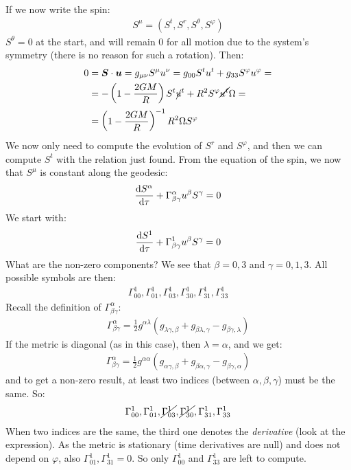 \documentclass[../template.tex]{subfiles}
\begin{document}
\begin{example}
    If we now write the spin:
    \begin{align*}
        S^\mu = (S^t, S^r, S^\theta, S^\varphi)
    \end{align*}
    $S^\theta = 0$ at the start, and will remain $0$ for all motion due to the system's symmetry (there is no reason for such a rotation). Then:
    \begin{align*}
        0 &= \bm{S} \cdot \bm{u} = g_{\mu \nu} S^\mu u^\nu = g_{00} S^t u^t + g_{33} S^\varphi u^\varphi  =\\
        &= -\left(1-\frac{2GM}{R} \right) S^t \cancel{u}^t + R^2 S^\varphi \cancel{u^t }\Omega = \\
        &= \left(1-\frac{2GM}{R} \right)^{-1} R^2 \Omega S^\varphi
    \end{align*}  
    We now only need to compute the evolution of $S^r$ and $S^\varphi$, and then we can compute $S^t$ with the relation just found. From the equation of the spin, we now that $S^\mu$ is constant along the geodesic:
    \begin{align*}
        \dv{S^\alpha}{\tau} + \Gamma^\alpha_{\beta \gamma} u^\beta S^\gamma = 0
    \end{align*} 
    We start with:
    \begin{align*}
        \dv{S^1}{\tau} + \Gamma^1_{\beta \gamma} u^\beta S^\gamma = 0
    \end{align*}
    What are the non-zero components? We see that $\beta = 0,3$ and $\gamma = 0,1,3$. All possible symbols are then:
    \begin{align*}
        \Gamma^1_{00}, \Gamma^1_{01}, \Gamma^1_{03}, \Gamma^1_{30}, \Gamma^1_{31}, \Gamma_{33}^1
    \end{align*}  
    Recall the definition of $\Gamma^\alpha_{\beta \gamma}$:
    \begin{align*}
        \Gamma^\alpha_{\beta \gamma} = \frac{1}{2}g^{\alpha \lambda} (g_{\lambda \gamma, \beta} + g_{\beta \lambda, \gamma} - g_{\beta \gamma , \lambda}) 
    \end{align*}  
    If the metric is diagonal (as in this case), then $\lambda = \alpha$, and we get:
    \begin{align*}
        \Gamma^\alpha_{\beta \gamma} = \frac{1}{2} g^{\alpha \alpha} (g_{\alpha \gamma, \beta} + g_{\beta \alpha, \gamma}- g_{\beta \gamma, \alpha}) 
    \end{align*} 
    and to get a non-zero result, at least two indices (between $\alpha, \beta, \gamma$) must be the same. So:
    \begin{align*}
        \Gamma^1_{00}, \Gamma^1_{01}, \cancel{\Gamma^1_{03}},\cancel{\Gamma^1_{30}}, \Gamma^1_{31}, \Gamma_{33}^1
    \end{align*}
    When two indices are the same, the third one denotes the \textit{derivative} (look at the expression). As the metric is stationary (time derivatives are null) and does not depend on $\varphi$, also $\Gamma^1_{01}, \Gamma^1_{31} = 0$. So only $\Gamma^1_{00}$ and $\Gamma^1_{33}$ are left to compute.
    

\end{example}
\end{document}
